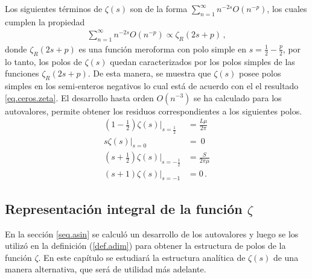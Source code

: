 Los siguientes términos de $\zeta (s)$ son de la forma $\sum _{n=1} ^{\infty} n ^{-2s} O ( n ^{-p})$, los cuales cumplen la propiedad
\begin{align}
	\sum _{n=1} ^{\infty} n ^{-2s} O ( n ^{-p}) 
	\propto
	\zeta _R (2s+p)
	\, ,
\end{align}
donde $\zeta _R (2s+p)$ es una función meroforma con polo simple en $s = \frac{1}{2} - \frac{p}{2}$,
por lo tanto, los polos de $\zeta (s)$ quedan caracterizados por los polos simples de las funciones  $\zeta _R (2s+p)$. De esta manera, se muestra que $\zeta (s)$ posee polos simples en los semi-enteros negativos lo cual está de acuerdo con el el resultado \eqref{eq.ceros.zeta}. El desarrollo hasta orden $O(n^{-3})$ se ha calculado para los autovalores, permite obtener los residuos correspondientes a los siguientes polos.
\begin{equation}
\begin{aligned}\label{eq.polos.asin}
	\left(1- \frac{1}{2} \right) \zeta  (s)| _{s=\frac{1}{2}} &= 
\frac{L \mu }{2 \pi } 
\\[5pt]
	s \zeta  (s) |_{s=0} &= \ 0 
\\[5pt]
	\left( s + \frac{1}{2} \right)\zeta  (s) | _{s=-\frac{1}{2}} &= 		\frac{S}{2 \pi \mu } 
\\[5pt]
	(s+1) \zeta (s) |_{s=-1} &=  0
	\, .
\end{aligned}
\end{equation}



\subsection{Representación integral de la función $\zeta$}
{\label{sec.complejo}}

En la sección \ref{seq.asin} se calculó un desarrollo de los autovalores y luego se
los utilizó en la definición (\ref{def.adim}) para obtener
la estructura de polos de la función $\zeta$. En este capítulo se estudiará la
estructura analítica de $\zeta (s)$ de una manera alternativa, que será de utilidad
más adelante.

